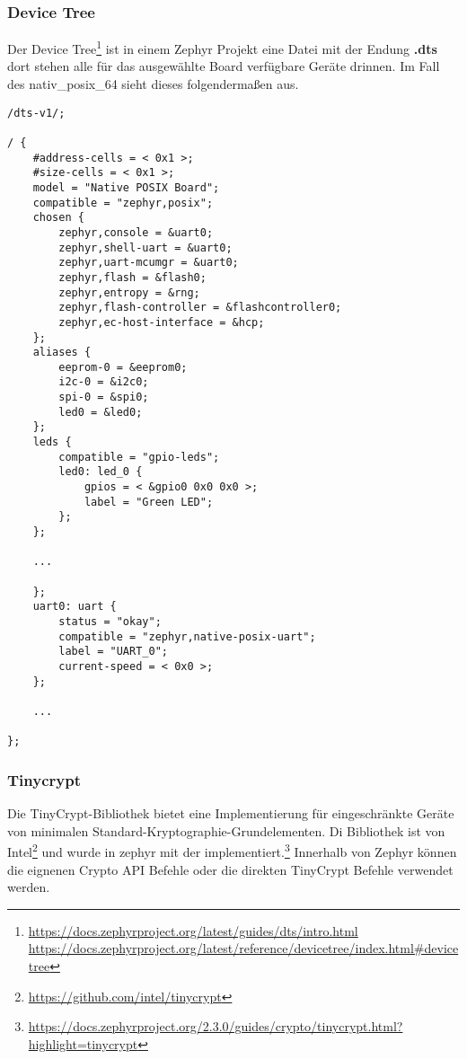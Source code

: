     \subsubsection{Device Tree}
    Der Device Tree\footnote{\url{https://docs.zephyrproject.org/latest/guides/dts/intro.html}\\\url{https://docs.zephyrproject.org/latest/reference/devicetree/index.html\#devicetree}} ist 
    in einem Zephyr Projekt eine Datei mit der Endung \textbf{.dts} dort stehen alle für das ausgewählte Board verfügbare Geräte drinnen.
    Im Fall des nativ\_posix\_64 sieht dieses folgendermaßen aus. 
    \begin{lstlisting}[style=StyleC, captionpos=b, caption=West Beispiel, label=West Beispiel]
/dts-v1/;

/ {
    #address-cells = < 0x1 >;
    #size-cells = < 0x1 >;
    model = "Native POSIX Board";
    compatible = "zephyr,posix";
    chosen {
        zephyr,console = &uart0;
        zephyr,shell-uart = &uart0;
        zephyr,uart-mcumgr = &uart0;
        zephyr,flash = &flash0;
        zephyr,entropy = &rng;
        zephyr,flash-controller = &flashcontroller0;
        zephyr,ec-host-interface = &hcp;
    };
    aliases {
        eeprom-0 = &eeprom0;
        i2c-0 = &i2c0;
        spi-0 = &spi0;
        led0 = &led0;
    };
    leds {
        compatible = "gpio-leds";
        led0: led_0 {
            gpios = < &gpio0 0x0 0x0 >;
            label = "Green LED";
        };
    };

    ...

    };
    uart0: uart {
        status = "okay";
        compatible = "zephyr,native-posix-uart";
        label = "UART_0";
        current-speed = < 0x0 >;
    };
    
    ...

};    
    \end{lstlisting}


\newpage
    \subsubsection{Tinycrypt}
    Die TinyCrypt-Bibliothek bietet eine Implementierung für eingeschränkte Geräte von minimalen Standard-Kryptographie-Grundelementen.
    Di Bibliothek ist von Intel\footnote{\url{https://github.com/intel/tinycrypt}} und wurde in zephyr mit der implementiert.\footnote{\url{https://docs.zephyrproject.org/2.3.0/guides/crypto/tinycrypt.html?highlight=tinycrypt}} 
    Innerhalb von Zephyr können die eignenen Crypto API Befehle oder die direkten TinyCrypt Befehle verwendet werden. 

